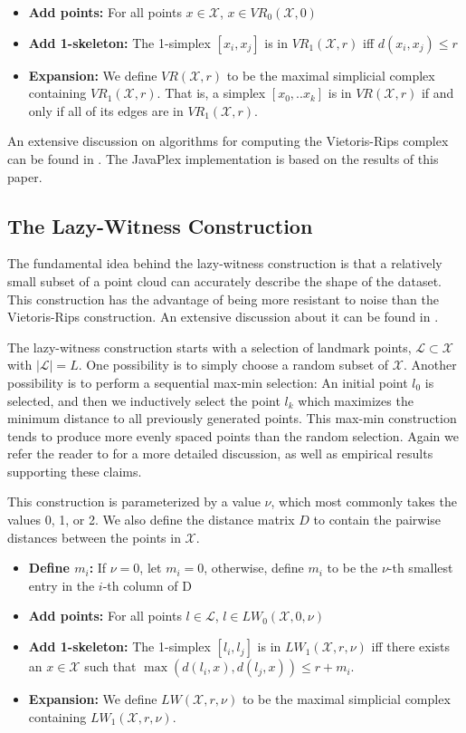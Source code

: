 \documentclass[10pt]{article}
\begin{document}
\begin{itemize}
\item {\bf Add points:} For all points $x \in \mathcal{X}$, $x \in VR_0(\mathcal{X}, 0)$
\item {\bf Add 1-skeleton:} The 1-simplex $[x_i, x_j]$ is in $VR_1(\mathcal{X}, r)$ iff $d(x_i, x_j) \leq r$
\item {\bf Expansion:} We define $VR(\mathcal{X}, r)$ to be the maximal simplicial complex containing $VR_1(\mathcal{X}, r)$. That is, a simplex $[x_0, .. x_k]$ is in $VR(\mathcal{X}, r)$ if and only if all of its edges are in $VR_1(\mathcal{X}, r)$.
\end{itemize}

An extensive discussion on algorithms for computing the Vietoris-Rips complex can be found in \cite{Zomorodian}. The JavaPlex implementation is based on the results of this paper.

\subsection{The Lazy-Witness Construction}
The fundamental idea behind the lazy-witness construction is that a relatively small subset of a point cloud can accurately describe the shape of the dataset. This construction has the advantage of being more resistant to noise than the Vietoris-Rips construction. An extensive discussion about it can be found in \cite{Witness}. 

The lazy-witness construction starts with a selection of landmark points, $\mathcal{L} \subset \mathcal{X}$ with $|\mathcal{L}| = L$. One possibility is to simply choose a random subset of $\mathcal{X}$. Another possibility is to perform a sequential max-min selection: An initial point $l_0$ is selected, and then we inductively select the point $l_k$ which maximizes the minimum distance to all previously generated points. This max-min construction tends to produce more evenly spaced points than the random selection. Again we refer the reader to \cite{Witness} for a more detailed discussion, as well as empirical results supporting these claims.

This construction is parameterized by a value $\nu$, which most commonly takes the values 0, 1, or 2. We also define the distance matrix $D$ to contain the pairwise distances between the points in $\mathcal{X}$. 

\begin{itemize}
\item {\bf Define $m_i$:} If $\nu = 0$, let $m_i = 0$, otherwise, define $m_i$ to be the $\nu$-th smallest entry in the $i$-th column of D
\item {\bf Add points:} For all points $l \in \mathcal{L}$, $l \in LW_0(\mathcal{X}, 0, \nu)$
\item {\bf Add 1-skeleton:} The 1-simplex $[l_i, l_j]$ is in $LW_1(\mathcal{X}, r, \nu)$ iff there exists an $x \in \mathcal{X}$ such that $\max(d(l_i, x), d(l_j, x)) \leq r + m_i$.
\item {\bf Expansion:} We define $LW(\mathcal{X}, r, \nu)$ to be the maximal simplicial complex containing $LW_1(\mathcal{X}, r, \nu)$. 
\end{itemize}
\end{document}
